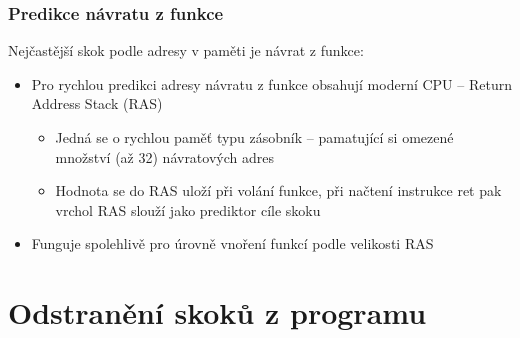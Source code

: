 \documentclass{beamer}
\begin{document}
\begin{frame}
\frametitle{Predikce návratu z funkce}

Nejčastější skok podle adresy v paměti je návrat z funkce:
\begin{itemize}
\item Pro rychlou predikci adresy návratu z funkce obsahují moderní CPU -- Return Address Stack (RAS)
\begin{itemize}
\item Jedná se o rychlou paměť typu zásobník -- pamatující si omezené množství (až 32) návratových adres
\item Hodnota se do RAS uloží při volání funkce, při načtení instrukce ret pak vrchol RAS slouží jako prediktor cíle skoku
\end{itemize}
\item Funguje spolehlivě pro úrovně vnoření funkcí podle velikosti RAS
\end{itemize}
\end{frame}

\section{Odstranění skoků z programu}
\end{document}
